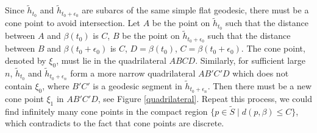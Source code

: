 \documentclass[reqno]{amsart}
\theoremstyle{plain}
\theoremstyle{definition}
\theoremstyle{remark}
\theoremstyle{definition}
\newcommand{\?}{\textcolor{red}{?}}
\begin{document}
Since $\tilde{h}_{t_0}$ and $\tilde{h}_{t_0+\epsilon_0}$ are subarcs of the same simple flat geodesic, there must be a cone point to avoid intersection. Let $A$ be the point on $\tilde{h}_{t_0}$ such that the distance between $A$ and $\beta(t_0)$ is $C$, $B$ be the point on $\tilde{h}_{t_0+\epsilon_0}$ such that the distance between $B$ and $\beta(t_0+\epsilon_0)$ is $C$, $D = \beta(t_0)$, $C = \beta(t_0+ \epsilon_0)$. The cone point, denoted by $\xi_0$, must lie in the quadrilateral $ABCD$. Similarly, for sufficient large $n$, $\tilde{h}_{t_0}$ and $\tilde{h}_{t_0+\epsilon_n}$ form a more narrow quadrilateral $AB'C'D$ which does not contain $\xi_0$, where $B'C'$ is a geodesic segment in $\tilde{h}_{t_0+\epsilon_n}$. Then there must be a new cone point $\xi_1$ in $AB'C'D$, see Figure \ref{quadrilateral}. Repeat this process, we could find infinitely many cone points in the compact region $\{p\in \tilde{S}\mid{}d(p,\beta)\le C\}$, which contradicts to the fact that cone points are discrete.
\end{document}
